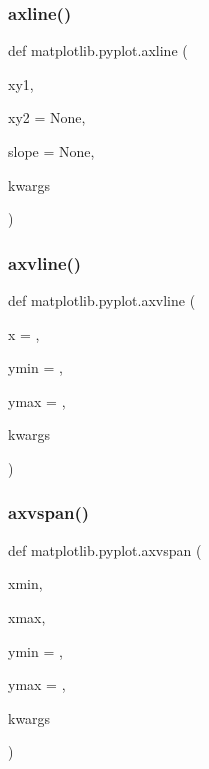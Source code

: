 \mbox{\label{namespacematplotlib_1_1pyplot_a0482c59aad018dea18535a2cd934fce4}} 
\subsubsection{\texorpdfstring{axline()}{axline()}}
{\footnotesize\ttfamily def matplotlib.\+pyplot.\+axline (\begin{DoxyParamCaption}\item[{}]{xy1,  }\item[{}]{xy2 = {\ttfamily None},  }\item[{}]{slope = {\ttfamily None},  }\item[{}]{kwargs }\end{DoxyParamCaption})}

\mbox{\label{namespacematplotlib_1_1pyplot_a843009c72c87d84f60c0701f2548dde9}} 
\subsubsection{\texorpdfstring{axvline()}{axvline()}}
{\footnotesize\ttfamily def matplotlib.\+pyplot.\+axvline (\begin{DoxyParamCaption}\item[{}]{x = {},  }\item[{}]{ymin = {},  }\item[{}]{ymax = {},  }\item[{}]{kwargs }\end{DoxyParamCaption})}

\mbox{\label{namespacematplotlib_1_1pyplot_abc33bd7c4ef7fd70c958c611238841bc}} 
\subsubsection{\texorpdfstring{axvspan()}{axvspan()}}
{\footnotesize\ttfamily def matplotlib.\+pyplot.\+axvspan (\begin{DoxyParamCaption}\item[{}]{xmin,  }\item[{}]{xmax,  }\item[{}]{ymin = {},  }\item[{}]{ymax = {},  }\item[{}]{kwargs }\end{DoxyParamCaption})}

